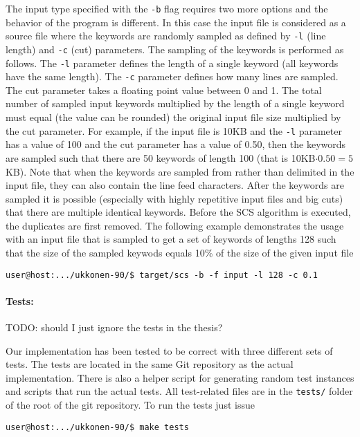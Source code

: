 \documentclass[english,twoside,censored,csm,algorithms-track-2020]{HYthesisML}
\theoremstyle{plain}
\theoremstyle{definition}
\begin{document}
The input type specified with the \texttt{-b} flag requires two more options and the behavior of
the program is
different. In this case the input file is considered as a source file where the keywords are randomly
sampled as defined by \texttt{-l} (line length) and \texttt{-c} (cut) parameters.
The sampling of the keywords is
performed as follows. The \texttt{-l} parameter defines the length of a single keyword (all keywords have
the same length). The \texttt{-c} parameter defines how many lines are sampled. The cut parameter takes a
floating point value between 0 and 1. The total number of sampled input keywords multiplied by
the length of a single keyword must equal (the value can be rounded) the original input file size
multiplied by the cut parameter. For example, if the input file is 10KB and the \texttt{-l}
parameter has a value
of 100 and the cut parameter has a value of 0.50, then the keywords are sampled such that there
are 50 keywords of length 100 (that is 10KB$\cdot 0.50 = 5$KB). Note that when the
keywords are sampled from rather than delimited in the input file, they can also contain the line
feed characters. After the keywords are sampled it is possible (especially with highly repetitive
input files and big cuts) that there are multiple identical keywords. Before the SCS algorithm
is executed, the duplicates are first removed. The following example
demonstrates the usage with an input file that is sampled to get a set of keywords of lengths 128
such that the size of the sampled keywods equals 10\% of the size of the given input file

\begin{verbatim}
user@host:.../ukkonen-90/$ target/scs -b -f input -l 128 -c 0.1
\end{verbatim}

\paragraph{Tests:}
TODO: should I just ignore the tests in the thesis?

Our implementation has been tested to be correct with three different sets of tests. The tests are
located in the same Git repository as the actual implementation. There is also a helper script for
generating random test instances and scripts that run the actual tests.
All test-related files are in the \texttt{tests/} folder of the
root of the git repository. To run the tests just issue

\begin{verbatim}
user@host:.../ukkonen-90/$ make tests
\end{verbatim}
\end{document}
